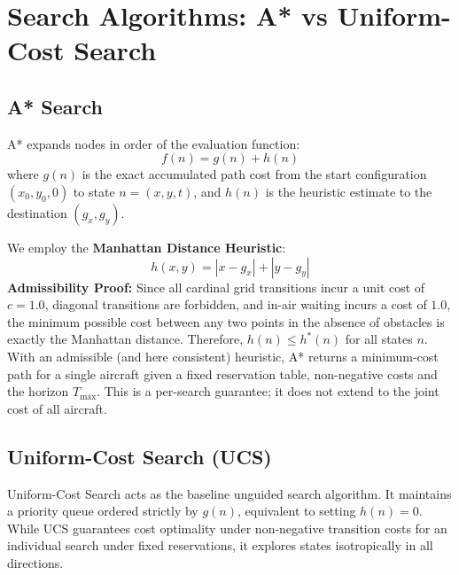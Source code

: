 \documentclass[11pt,a4paper]{article}
\begin{document}
\section{Search Algorithms: A* vs Uniform-Cost Search}
\subsection{A* Search}
A* \cite{hart1968} expands nodes in order of the evaluation function:
\begin{equation}
f(n) = g(n) + h(n)
\end{equation}
where $g(n)$ is the exact accumulated path cost from the start configuration $(x_0, y_0, 0)$ to state $n = (x, y, t)$, and $h(n)$ is the heuristic estimate to the destination $(g_x, g_y)$.

We employ the \textbf{Manhattan Distance Heuristic}:
\begin{equation}
h(x, y) = |x - g_x| + |y - g_y|
\end{equation}
\textbf{Admissibility Proof:} Since all cardinal grid transitions incur a unit cost of $c=1.0$, diagonal transitions are forbidden, and in-air waiting incurs a cost of $1.0$, the minimum possible cost between any two points in the absence of obstacles is exactly the Manhattan distance. Therefore, $h(n) \le h^*(n)$ for all states $n$. With an admissible (and here consistent) heuristic, A* returns a minimum-cost path for a single aircraft given a fixed reservation table, non-negative costs and the horizon $T_{\max}$. This is a per-search guarantee; it does not extend to the joint cost of all aircraft.

\subsection{Uniform-Cost Search (UCS)}
Uniform-Cost Search acts as the baseline unguided search algorithm. It maintains a priority queue ordered strictly by $g(n)$, equivalent to setting $h(n) = 0$. While UCS guarantees cost optimality under non-negative transition costs for an individual search under fixed reservations, it explores states isotropically in all directions.
\end{document}
